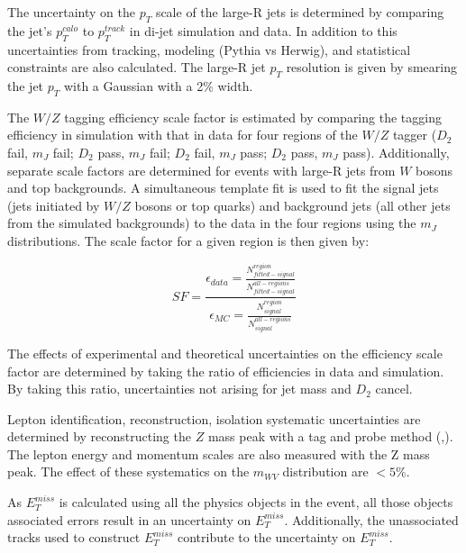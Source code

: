 The uncertainty on the $p_{T}$ scale of the large-R jets is determined by comparing the jet's $p_{T}^{calo}$ to $p_{T}^{track}$ in di-jet simulation and data. In addition to this uncertainties from tracking, modeling (Pythia vs Herwig), and statistical constraints are also calculated. The large-R jet $p_{T}$ resolution is given by smearing the jet $p_{T}$ with a Gaussian with a 2\% width.

The $W/Z$ tagging efficiency scale factor is estimated by comparing the tagging efficiency in simulation with that in data for four regions of the $W/Z$ tagger ($D_{2}$ fail, $m_{J}$ fail; $D_{2}$ pass, $m_{J}$ fail; $D_{2}$ fail, $m_{J}$ pass; $D_{2}$ pass, $m_{J}$ pass). Additionally, separate scale factors are determined for events with large-R jets from $W$ bosons and top backgrounds. A simultaneous template fit is used to fit the signal jets (jets initiated by $W/Z$ bosons or top quarks) and background jets (all other jets from the simulated backgrounds) to the data in the four regions using the $m_{J}$ distributions. The scale factor for a given region is then given by:

\begin{equation}
SF = \frac{ \epsilon_{data} = \frac{ N^{region}_{fitted-signal }}{N^{all-regions}_{fitted-signal}}}    {  \epsilon_{MC} = \frac{N^{region}_{signal}}{N^{all-regions}_{signal}}}  
\end{equation}
 
The effects of experimental and theoretical uncertainties on the efficiency scale factor are determined by taking the ratio of efficiencies in data and simulation. By taking this ratio, uncertainties not arising for jet mass and $D_{2}$ cancel. 

Lepton identification, reconstruction, isolation systematic uncertainties are determined by reconstructing the $Z$ mass peak with a tag and probe method (\cite{elec_syst},\cite{muon_syst}). The lepton energy and momentum scales are also measured with the Z mass peak. The effect of these systematics on the $m_{WV}$ distribution are $<5\%$.

As $E_{T}^{miss}$ is calculated using all the physics objects in the event, all those objects associated errors result in an uncertainty on $E_{T}^{miss}$. Additionally, the unassociated tracks used to construct $E_{T}^{miss}$ contribute to the uncertainty on $E_{T}^{miss}$. 


